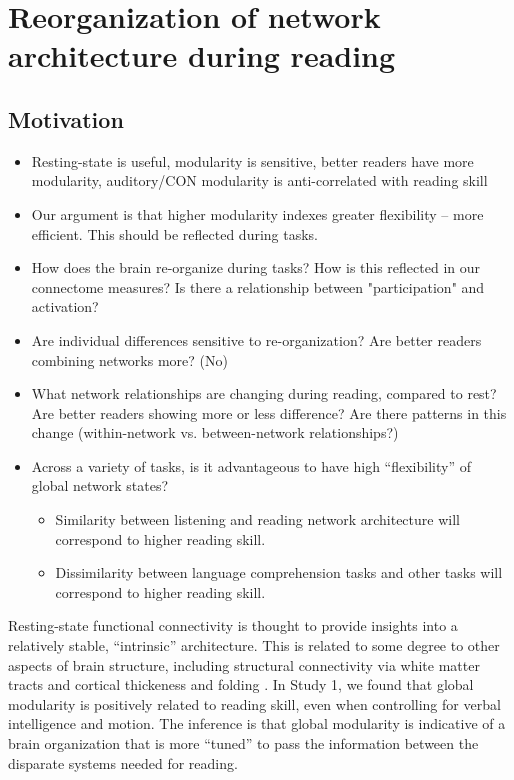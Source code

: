 \chapter{Reorganization of network architecture during reading}

\section{Motivation}

\begin{itemize}
	\item Resting-state is useful, modularity is sensitive, better readers have more modularity, auditory/CON modularity is anti-correlated with reading skill
	\item Our argument is that higher modularity indexes greater flexibility -- more efficient. This should be reflected during tasks.
	\item How does the brain re-organize during tasks? How is this reflected in our connectome measures? Is there a relationship between "participation" and activation?
	\item Are individual differences sensitive to re-organization? Are better readers combining networks more? (No)
	\item What network relationships are changing during reading, compared to rest? Are better readers showing more or less difference? Are there patterns in this change (within-network vs. between-network relationships?)

	\item Across a variety of tasks, is it advantageous to have high ``flexibility'' of global network states? 
	\begin{itemize}
		\item Similarity between listening and reading network architecture will correspond to higher reading skill.
		\item Dissimilarity between language comprehension tasks and other tasks will correspond to higher reading skill.
	\end{itemize}

\end{itemize}

Resting-state functional connectivity is thought to provide insights into a relatively stable, ``intrinsic'' architecture. This is related to some degree to other aspects of brain structure, including structural connectivity via white matter tracts and cortical thickeness and folding \citep{}. In Study 1, we found that global modularity is positively related to reading skill, even when controlling for verbal intelligence and motion. The inference is that global modularity is indicative of a brain organization that is more ``tuned'' to pass the information between the disparate systems needed for reading. 

